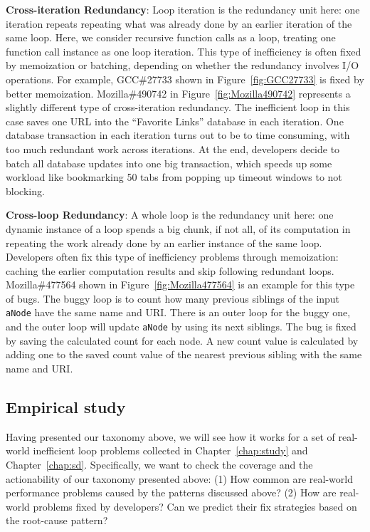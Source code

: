 {\textbf{Cross-iteration Redundancy}}:
Loop iteration is the redundancy unit here:
one iteration repeats
repeating what was already done by an earlier iteration of the same loop.
Here, we consider recursive function calls as a loop, treating one function 
call instance as one loop iteration. 
This type of inefficiency is often fixed by memoization or batching, depending
on whether the redundancy involves I/O operations.
For example, GCC\#27733 shown in Figure~\ref{fig:GCC27733} 
is fixed by better memoization. 
Mozilla\#490742 in Figure~\ref{fig:Mozilla490742} represents a slightly different type of cross-iteration
redundancy. The inefficient loop in this case saves one URL into the ``Favorite
Links'' database in each iteration. One database transaction in each iteration
turns out to be to time consuming, with too much redundant work across
iterations. At the end, developers decide to batch all database updates into 
one big transaction, which speeds up some workload like 
bookmarking 50 tabs 
from popping up timeout windows to not blocking.

{\textbf{Cross-loop Redundancy}}:
A whole loop is the redundancy unit here:
one dynamic instance of a loop spends a big chunk, if not all, of its
computation in repeating the work already done by an
earlier instance of the same loop.
Developers often fix this type of inefficiency problems through memoization:
caching the earlier computation results and skip following redundant loops.
Mozilla\#477564 shown in Figure~\ref{fig:Mozilla477564} is an example for this type of bugs. 
The buggy loop is to count how many previous siblings of the input \texttt{aNode} have the same name and URI. 
There is an outer loop for the buggy one, and the outer loop will update \texttt{aNode} by using its next siblings. 
The bug is fixed by saving the calculated count for each node. 
A new count value is calculated by adding one to the saved count value of the nearest previous sibling with the same name and URI.


\subsection{Empirical study}
\label{sec:6_tax_study}
Having presented our taxonomy above, we will see how it works for a set of
real-world inefficient loop problems collected in Chapter~\ref{chap:study} and Chapter~\ref{chap:sd}. 
Specifically, we want to check the 
coverage and the actionability of our taxonomy presented above:
(1) How common are real-world performance problems caused by the 
patterns discussed above?
(2) How are real-world problems fixed by developers? Can we predict their
fix strategies based on the root-cause pattern?

